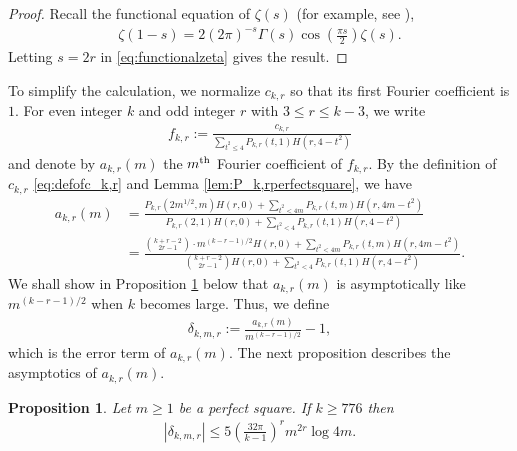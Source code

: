 \documentclass[11pt,letterpaper,reqno]{amsart}
\numberwithin{figure}{section}
\numberwithin{table}{section}
\theoremstyle{definition}
\theoremstyle{plain}
\newtheorem{proposition}[theorem]{Proposition}
\theoremstyle{definition}
\theoremstyle{definition}
\theoremstyle{remark}
\numberwithin{equation}{section}
\theoremstyle{remark}
\begin{document}
    \begin{proof}
     
Recall the functional equation of $\zeta(s)$ (for example, see \cite[Theorem 12.7]{ApostolNT}), 
\begin{align}
\zeta(1-s)=2(2\pi)^{-s}\Gamma(s)\cos\left(\frac{\pi s}{2}\right)\zeta(s). \label{eq:functionalzeta}
\end{align}
Letting $s=2r$ in \eqref{eq:functionalzeta} gives the result.
    \end{proof}
 To simplify the calculation, we normalize $c_{k,r}$ so that its first Fourier coefficient is $1$. For even integer $k$  and odd integer $r$ with $3\leq r\leq k-3$, we write
\begin{align}
    f_{k,r}:=\frac{c_{k,r}}{\sum_{t^2\leq4}P_{k,r}(t,1)H(r,4-t^2)}\label{eq:defoffr}
\end{align}
and denote by $a_{k,r}(m)$ the $m^{{\rm th}}$ Fourier coefficient of $f_{k,r}$. By the definition of $c_{k,r}$ \eqref{eq:defofc_k,r} and Lemma \ref{lem:P_k,rperfectsquare}, we have
\begin{align}
    a_{k,r}(m)&=\frac
    {P_{k,r}(2m^{1/2},m)H(r,0)+\sum_{t^2<4m}P_{k,r}(t,m)H(r,4m-t^2)}{P_{k,r}(2,1)H(r,0)+\sum_{t^2<4}P_{k,r}(t,1)H(r,4-t^2)}\\&=\frac
    {\binom{k+r-2}{2r-1}\cdot m^{(k-r-1)/2}H(r,0)+\sum_{t^2<4m}P_{k,r}(t,m)H(r,4m-t^2)}{\binom{k+r-2}{2r-1}H(r,0)+\sum_{t^2<4}P_{k,r}(t,1)H(r,4-t^2)}.\label{eq:akrmiddlestep}
\end{align}
We shall show in Proposition \ref{prop:estimateofFourierco} below that $a_{k,r}(m)$ is asymptotically like $m^{(k-r-1)/2}$ when $k$ becomes large. Thus, we define
\begin{align}
    \delta_{k,m,r}:=\frac{a_{k,r}(m)}{m^{(k-r-1)/2}}-1,
\end{align}
which is the error term of $a_{k,r}(m)$. The next proposition describes the asymptotics of $a_{k,r}(m)$. 
\begin{proposition}\label{prop:estimateofFourierco}
Let $m\geq1$ be a perfect square.
If $k\geq776$ then
\begin{align}
|\delta_{k,m,r}|\leq5\left(\frac{32\pi}{k-1}\right)^rm^{2r}\log4m.
\end{align} 
\end{proposition}
\end{document}

